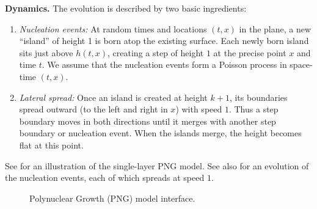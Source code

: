 \documentclass[letterpaper,11pt,oneside,reqno]{book}
\numberwithin{equation}{chapter}  %
\theoremstyle{definition}
\begin{document}
\smallskip

\noindent\textbf{Dynamics.} The evolution is described by two basic ingredients:
\begin{enumerate}
\item \emph{Nucleation events:} At random times and locations $(t,x)$ in the plane, a new ``island'' of height 1 is born atop the existing surface. Each newly born island sits just above $h(t,x)$, creating a step of height $1$ at the precise point $x$ and time $t$.
	We assume that the nucleation events form a Poisson process in space-time $(t,x)$.
\item \emph{Lateral spread:} Once an island is created at height $k+1$, its boundaries spread outward (to the left and right in $x$) with speed $1$. Thus a step boundary moves in both directions until it merges with another step boundary or nucleation event.
	When the islands merge, the height becomes flat at this point.
\end{enumerate}
See  for an illustration of the single-layer PNG model.
See also 
for an evolution
of the nucleation events, each of which
spreads at speed $1$.

\begin{figure}[htb]
 \centering
 \caption{Polynuclear Growth (PNG) model interface.}
 \label{lecture12:fig:PNG}
\end{figure}
\end{document}
